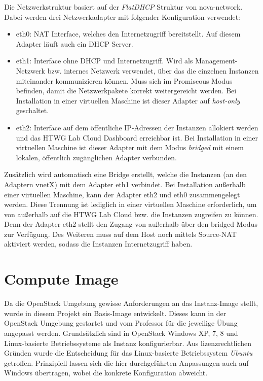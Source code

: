 Die Netzwerkstruktur basiert auf der \emph{FlatDHCP} Struktur von nova-network. 
Dabei werden drei Netzwerkadapter mit folgender Konfiguration verwendet:

\begin{itemize}
\item eth0: NAT Interface, welches den Internetzugriff bereitstellt. Auf diesem Adapter läuft auch ein DHCP Server.
\item eth1: Interface ohne DHCP und Internetzugriff. Wird als Management-Netzwerk bzw. internes Netzwerk verwendet, über das die einzelnen Instanzen miteinander kommunizieren können. Muss sich im Promiscous Modus befinden, damit die Netzwerkpakete korrekt weitergereicht werden. Bei Installation in einer virtuellen Maschine ist dieser Adapter auf \emph{host-only} geschaltet.
\item eth2: Interface auf dem öffentliche IP-Adressen der Instanzen allokiert werden und das HTWG Lab Cloud Dashboard erreichbar ist. Bei Installation in einer virtuellen Maschine ist dieser Adapter mit dem Modus \emph{bridged}  mit einem lokalen, öffentlich zugänglichen Adapter verbunden.
\end{itemize}

Zusätzlich wird automatisch eine Bridge erstellt, welche die Instanzen (an den Adaptern vnetX) mit dem Adapter eth1 verbindet.
Bei Installation außerhalb einer virtuellen Maschine, kann der Adapter eth2 und eth0 zusammengelegt werden. 
Diese Trennung ist lediglich in einer virtuellen Maschine erforderlich, um von außerhalb auf die HTWG Lab Cloud bzw. die Instanzen zugreifen zu können.
Denn der Adapter eth2 stellt den Zugang von außerhalb über den bridged Modus zur Verfügung.
Des Weiteren muss auf dem Host noch mittels  Source-NAT aktiviert werden, sodass die Instanzen Internetzugriff haben.

\section{Compute Image}

Da die OpenStack Umgebung gewisse Anforderungen an das Instanz-Image stellt, wurde in diesem Projekt ein Basis-Image entwickelt. 
Dieses kann in der OpenStack Umgebung gestartet und vom Professor für die jeweilige Übung angepasst werden.
Grundsätzlich sind in OpenStack Windows XP, 7, 8 und Linux-basierte Betriebssysteme als Instanz konfigurierbar. 
Aus lizenzrechtlichen Gründen wurde die Entscheidung für das Linux-basierte Betriebssystem \emph{Ubuntu} getroffen. 
Prinzipiell lassen sich die hier durchgeführten Anpassungen auch auf Windows übertragen, wobei die konkrete Konfiguration abweicht.

